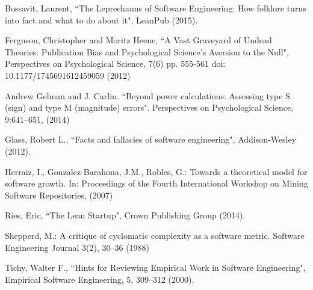 \documentclass{svjour3}                     %
\begin{document}
\begin{thebibliography}{}

 Bossavit, Laurent, ``The Leprechauns of Software Engineering: How folklore turns into fact and what to do about it", LeanPub (2015).

 Ferguson, Christopher and Moritz Heene, ``A Vast Graveyard of Undead Theories: Publication Bias and Psychological Science's Aversion to the Null",  Perspectives on Psychological Science, 7(6) pp. 555-561 doi: 10.1177/1745691612459059 (2012)

 Andrew Gelman and J. Carlin. ``Beyond power calculations: Assessing type S (sign) and type M (magnitude) errors". Perspectives on Psychological Science, 9:641–651, (2014)

 Glass, Robert L., ``Facts and fallacies of software engineering", Addison-Wesley (2012).

 Herraiz, I., Gonzalez-Barahona, J.M., Robles, G.: Towards a theoretical model for software growth. In: Proceedings of the
Fourth International Workshop on Mining Software Repositories,  (2007)



 Ries, Eric, ``The Lean Startup", Crown Publishing Group (2014).

 Shepperd, M.: A critique of cyclomatic complexity as a software metric. Software Engineering Journal 3(2), 30–36 (1988)

 Tichy, Walter F., ``Hints for Reviewing Empirical Work in Software Engineering", Empirical Software Engineering, 5, 309--312 (2000).

\end{thebibliography}
\end{document}
